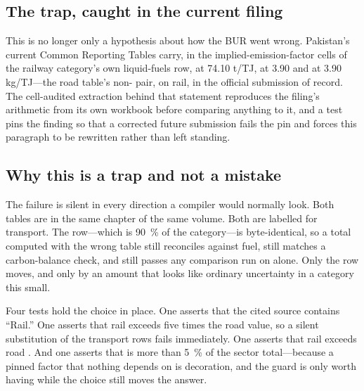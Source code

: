 \subsection{The trap, caught in the current filing}

This is no longer only a hypothesis about how the BUR went wrong. Pakistan's current
Common Reporting Tables carry, in the implied-emission-factor cells of the railway
category's own liquid-fuels row, \COtwo{} at \num{74.10} t/TJ, \CHfour{} at \num{3.90} and
\NtwoO{} at \num{3.90} kg/TJ---the road table's non-\COtwo{} pair, on rail, in the
official submission of record. The cell-audited extraction behind that statement
reproduces the filing's arithmetic from its own workbook before comparing anything to it,
and a test pins the finding so that a corrected future submission fails the pin and forces
this paragraph to be rewritten rather than left standing.

\subsection{Why this is a trap and not a mistake}

The failure is silent in every direction a compiler would normally look. Both tables are in the
same chapter of the same volume. Both are labelled for transport. The \COtwo{} row---which is
\SI{90}{\percent} of the category---is byte-identical, so a total computed with the wrong table
still reconciles against fuel, still matches a carbon-balance check, and still passes any
comparison run on \COtwo{} alone. Only the \NtwoO{} row moves, and only by an amount that looks
like ordinary uncertainty in a category this small.

Four tests hold the choice in place. One asserts that the cited source contains ``Rail.'' One
asserts that rail \NtwoO{} exceeds five times the road value, so a silent substitution of the
transport rows fails immediately. One asserts that rail \CHfour{} exceeds road \CHfour{}. And
one asserts that \NtwoO{} is more than \SI{5}{\percent} of the sector total---because a pinned
factor that nothing depends on is decoration, and the guard is only worth having while the
choice still moves the answer.
